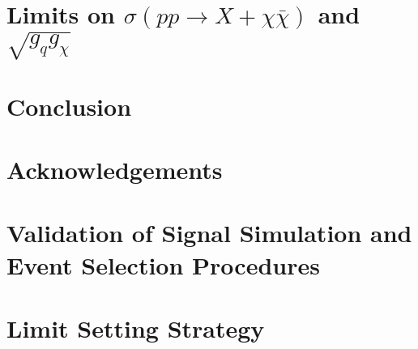 \documentclass[a4paper,11pt]{article}
\renewcommand{\=}[1]{\stackrel{#1}{=}} %
\begin{document}
\section{Limits on $\sigma(pp \rightarrow X + \chi\bar{\chi})$ and $\sqrt{g_{q}g_{\chi}}$} 
\label{sec:sec4}

\section{Conclusion} 
\label{sec:sec5}


\section{Acknowledgements} 
\label{sec:sec6}


\appendix
\section{Validation of Signal Simulation and Event Selection Procedures}
\label{AppendixA}


\section{Limit Setting Strategy}
\label{AppendixB}


\begin{thebibliography}{99}

\end{thebibliography}
\end{document}

